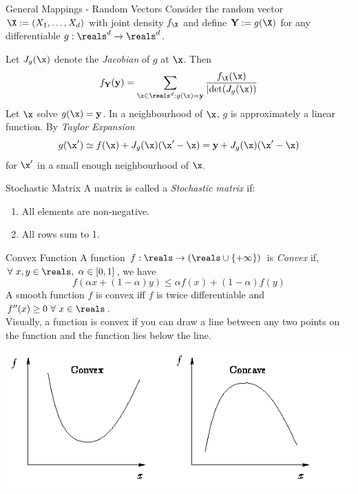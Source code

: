 \documentclass[11pt,a4paper]{article}
\begin{document}
  \begin{proposition}{General Mappings - Random Vectors}
    Consider the random vector $\X:=(X_1,\dots,X_d)$ with joint density $f_\X$ and define $\mathbf{Y}:=g(\X)$ for any differentiable $g:\reals^d\to\reals^d$.
    \par Let $J_g(\x)$ denote the \textit{Jacobian} of $g$ at $\x$. Then
    \[ f_\mathbf{Y}(\mathbf{y})=\sum_{\x\in\reals^d:g(\x)=\mathbf{y}}\frac{f_\X(\x)}{|\text{det}(J_g(\x))} \]
    Let $\x$ solve $g(\x)=\mathbf{y}$. In a neighbourhood of $\x$, $g$ is approximately a linear function. By \textit{Taylor Expansion}
    \[ g(\x')\simeq f(\x)+J_g(\x)(\x'-\x)=\mathbf{y}+J_g(\x)(\x'-\x) \]
    for $\x'$ in a small enough neighbourhood of $\x$.
  \end{proposition}


  \begin{definition}{Stochastic Matrix}
    A matrix is called a \textit{Stochastic matrix} if:
    \begin{enumerate}
      \item All elements are non-negative.
      \item All rows sum to 1.
    \end{enumerate}
  \end{definition}

  \begin{definition}{Convex Function}
    A function $f:\reals\to(\reals\cup\{+\infty\})$ is \textit{Convex} if, $\forall\ x,y\in\reals,\ \alpha\in[0,1]$, we have
    \[ f(\alpha x+(1-\alpha)y)\leq\alpha f(x)+(1-\alpha)f(y) \]
    A smooth function $f$ is convex iff $f$ is twice differentiable and $f''(x)\geq0\ \forall\ x\in\reals$.\\
    Visually, a function is convex if you can draw a line between any two points on the function and the function lies below the line.
    \begin{center}
      \includegraphics[scale=.5]{convex_concave.png}
    \end{center}
  \end{definition}
\end{document}
